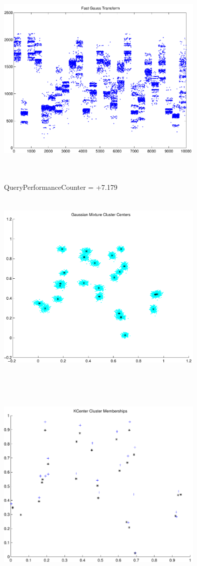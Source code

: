 \documentclass[9pt]{article}
\theoremstyle{plain}
\theoremstyle{definition}
\theoremstyle{remark}
\numberwithin{equation}{section}
\begin{document}
\includegraphics[width=10.0cm,height=10.0cm]{FGT25_Centers.pdf}

QueryPerformanceCounter  =  +7.179
\includegraphics[width=10.0cm,height=10.0cm]{GaussianMixture_ClusterCenters24_Centers.pdf}

\includegraphics[width=10.0cm,height=10.0cm]{KCenterClusterMemberships_24_Centers.pdf}
\end{document}
